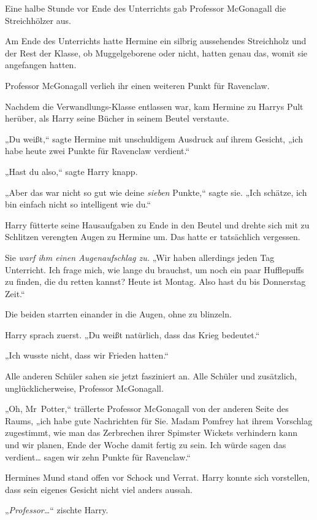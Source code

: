 {Eine halbe Stunde vor Ende des Unterrichts gab Professor McGonagall die Streichhölzer aus.

Am Ende des Unterrichts hatte Hermine ein silbrig aussehendes Streichholz und der Rest der Klasse, ob Muggelgeborene oder nicht, hatten genau das, womit sie angefangen hatten.

Professor McGonagall verlieh ihr einen weiteren Punkt für Ravenclaw.

\later

Nachdem die Verwandlungs-Klasse entlassen war, kam Hermine zu Harrys Pult herüber, als Harry seine Bücher in seinem Beutel verstaute.

„Du weißt,“ sagte Hermine mit unschuldigem Ausdruck auf ihrem Gesicht, „ich habe heute zwei Punkte für Ravenclaw verdient.“

„Hast du also,“ sagte Harry knapp.

„Aber das war nicht so gut wie deine \emph{sieben} Punkte,“ sagte sie. „Ich schätze, ich bin einfach nicht so intelligent wie du.“

Harry fütterte seine Hausaufgaben zu Ende in den Beutel und drehte sich mit zu Schlitzen verengten Augen zu Hermine um. Das hatte er tatsächlich vergessen.

Sie \emph{warf ihm einen Augenaufschlag zu.} „Wir haben allerdings jeden Tag Unterricht. Ich frage mich, wie lange du brauchst, um noch ein paar Hufflepuffs zu finden, die du retten kannst? Heute ist Montag. Also hast du bis Donnerstag Zeit.“

Die beiden starrten einander in die Augen, ohne zu blinzeln.

Harry sprach zuerst. „Du weißt natürlich, dass das Krieg bedeutet.“

„Ich wusste nicht, dass wir Frieden hatten.“

Alle anderen Schüler sahen sie jetzt fasziniert an. Alle Schüler und zusätzlich, unglücklicherweise, Professor McGonagall.

„Oh, Mr~Potter,“ trällerte Professor McGonagall von der anderen Seite des Raums, „ich habe gute Nachrichten für Sie. Madam Pomfrey hat ihrem Vorschlag zugestimmt, wie man das Zerbrechen ihrer Spimster Wickets verhindern kann und wir planen, Ende der Woche damit fertig zu sein. Ich würde sagen das verdient… sagen wir zehn Punkte für Ravenclaw.“

Hermines Mund stand offen vor Schock und Verrat. Harry konnte sich vorstellen, dass sein eigenes Gesicht nicht viel anders aussah.

„\emph{Professor…}“ zischte Harry.

}
